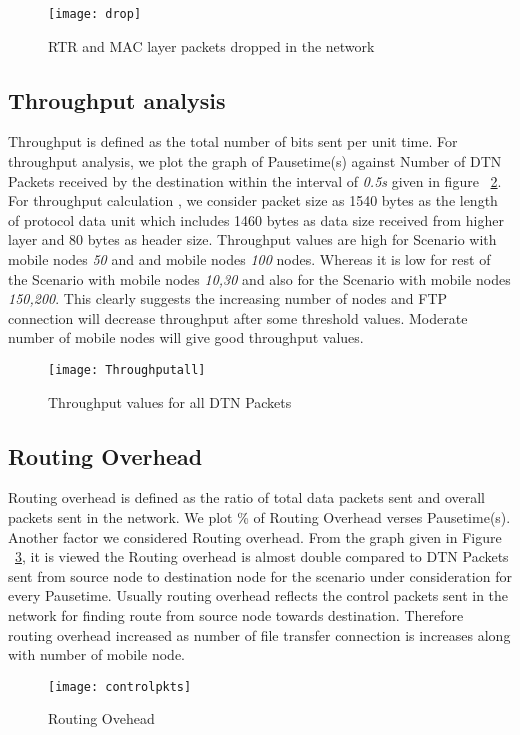 \documentclass[3p,times]{elsarticle}
\begin{document}
\begin{figure}[h]
\centering
\mbox{\texttt{[image: drop]}}
\caption{RTR and MAC layer packets dropped in the network}
\label{g2}
\end{figure}
\subsection{Throughput analysis}
Throughput is defined as the total number of bits sent per unit time. For throughput analysis, we plot the graph of Pausetime(s) against Number of DTN Packets received by the destination within the interval of \emph{0.5s} given in figure ~\ref {g3}. For throughput calculation , we consider packet size as 1540 bytes as the length of protocol data unit which includes 1460 bytes as data size received from higher layer and 80 bytes as header size. Throughput values are high for Scenario with mobile nodes \emph{50} and and mobile nodes \emph{100} nodes. Whereas it is low for rest of the Scenario with mobile nodes \emph{10,30} and also for the Scenario with mobile nodes \emph{150,200}. This clearly suggests the increasing number of nodes and FTP connection will decrease throughput after some threshold values. Moderate number of mobile nodes will give good throughput values.                  
\begin{figure}[h]
\centering
\mbox{\texttt{[image: Throughputall]}}
\caption{Throughput values for all DTN Packets}
\label{g3}
\end{figure}

\subsection{Routing Overhead}
Routing overhead is defined as the ratio of total data packets sent and overall packets sent in the network. We plot \% of Routing Overhead verses Pausetime(s).
Another factor we considered Routing overhead. From the graph given in Figure ~\ref{g4}, it is viewed the Routing overhead is almost double compared to DTN Packets sent from source node to destination node for the scenario under consideration for every Pausetime. Usually routing overhead reflects the control packets sent in the network for finding route from source node towards destination. Therefore routing overhead increased as number of file transfer connection is increases along with number of mobile node. 
\begin{figure}[t]
\centering
\mbox{\texttt{[image: controlpkts]}}
\caption{Routing Ovehead}
\label{g4}
\end{figure}
\end{document}
